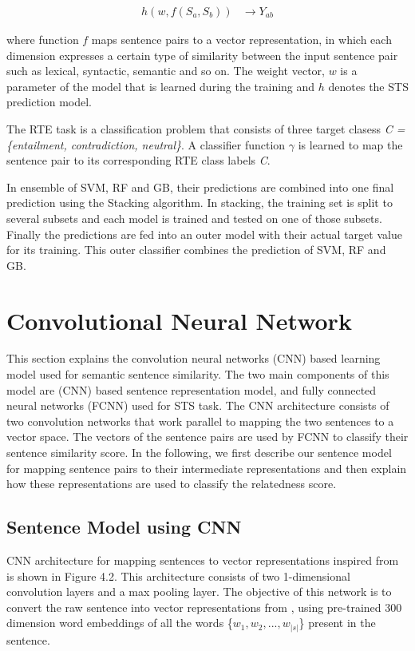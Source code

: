 \documentclass[12pt]{report} %
\begin{document}
	\begin{align} 
	h(w,f(S_a,S_b))  & \rightarrow Y_{ab} 
	\end{align}
	
	where function $f$ maps sentence pairs to a vector
	representation, in which each dimension expresses a certain type of
	similarity between the input sentence pair such as lexical, syntactic, semantic and so on. The weight vector,
	$w$ is a parameter of the model that is learned during the training and $h$ denotes the STS prediction model.
	
	The RTE task is a classification problem that consists of three target clasess  \textit{ C =\{entailment, contradiction, neutral\}}. A classifier function $\gamma$ is learned to map the sentence pair to its corresponding RTE class labels \textit{C}.
	
	In ensemble of SVM, RF and GB, their predictions are combined into one final prediction using the Stacking algorithm. In stacking, the training set is split to several subsets and each model is trained and tested on one of those subsets. Finally the predictions are fed into an outer model with their actual target value for its training. This outer classifier combines the prediction of SVM, RF and GB.
	
	
\section{Convolutional Neural Network}
	This section explains the convolution neural networks (CNN) based learning model used for semantic sentence similarity. The two main components of this model are (CNN) based sentence representation model, and fully connected neural networks (FCNN) used for STS task. The CNN architecture consists of two convolution networks that work parallel to mapping the two sentences to a vector space. The vectors of the sentence pairs are used by FCNN to classify their sentence similarity score. In the following, we first describe our sentence model for mapping sentence pairs to their intermediate representations and then explain how these representations are used to classify the relatedness score.
	
	\subsection{Sentence Model using CNN}
	CNN architecture for mapping sentences to
	vector representations inspired from \cite{shao2017hcti} is shown in Figure 4.2. This architecture consists of two 1-dimensional convolution layers and a max pooling layer. The objective of this network is to convert the raw sentence into vector representations from \cite{pennington2014glove}, using pre-trained 300 dimension word embeddings of all the words \{$w_{1}, w_{2},...,w_{|s|}$\} present in the sentence.
	
\end{document}
